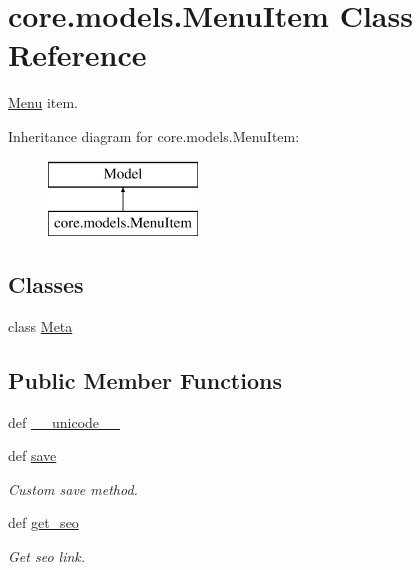 \hypertarget{classcore_1_1models_1_1MenuItem}{\section{core.\-models.\-Menu\-Item Class Reference}
\label{classcore_1_1models_1_1MenuItem}
}


\hyperlink{classcore_1_1models_1_1Menu}{Menu} item.  


Inheritance diagram for core.\-models.\-Menu\-Item\-:\begin{figure}[H]
\begin{center}
\leavevmode
\includegraphics[height=2.000000cm]{classcore_1_1models_1_1MenuItem}
\end{center}
\end{figure}
\subsection*{Classes}
\begin{DoxyCompactItemize}
\item 
class \hyperlink{classcore_1_1models_1_1MenuItem_1_1Meta}{Meta}
\end{DoxyCompactItemize}
\subsection*{Public Member Functions}
\begin{DoxyCompactItemize}
\item 
def \hyperlink{classcore_1_1models_1_1MenuItem_a7ca6064d82c1e02ddf732fccb5d1430b}{\-\_\-\-\_\-unicode\-\_\-\-\_\-}
\item 
def \hyperlink{classcore_1_1models_1_1MenuItem_ab51a5ab563ed2c10ab0a74342a1b4197}{save}
\begin{DoxyCompactList}\small\item\em Custom save method. \end{DoxyCompactList}\item 
def \hyperlink{classcore_1_1models_1_1MenuItem_a85b4e94e816f9575ad9a950c7e01d9cc}{get\-\_\-seo}
\begin{DoxyCompactList}\small\item\em Get seo link. \end{DoxyCompactList}\end{DoxyCompactItemize}
